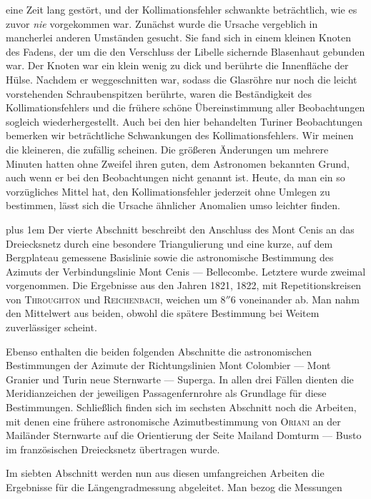 %
eine Zeit lang gestört, und der Kollimationsfehler schwankte beträchtlich, wie es zuvor \textit{nie} vorgekommen war. Zunächst wurde die Ursache vergeblich in mancherlei anderen Umständen gesucht. Sie fand sich in einem kleinen Knoten des Fadens, der um die den Verschluss der Libelle sichernde Blasenhaut gebunden war. Der Knoten war ein klein wenig zu dick und berührte die Innenfläche der Hülse. Nachdem er weggeschnitten war, sodass die Glasröhre nur noch die leicht vorstehenden Schraubenspitzen berührte, waren die Beständigkeit des Kollimationsfehlers und die frühere schöne Übereinstimmung aller Beobachtungen sogleich wiederhergestellt. Auch bei den hier behandelten Turiner Beobachtungen bemerken wir beträchtliche Schwankungen des Kollimationsfehlers. Wir meinen die kleineren, die zufällig scheinen. Die größeren Änderungen um mehrere Minuten hatten ohne Zweifel ihren guten, dem Astronomen bekannten Grund, auch wenn er bei den Beobachtungen nicht genannt ist. Heute, da man ein so vorzügliches Mittel hat, den Kollimationsfehler jederzeit ohne Umlegen zu bestimmen, lässt sich die Ursache ähnlicher Anomalien umso leichter finden.

\begingroup\rightskip=0pt plus 1em
Der vierte Abschnitt beschreibt den Anschluss des Mont Cenis an das Dreiecksnetz durch eine besondere Triangulierung und eine kurze, auf dem Bergplateau gemessene Basislinie sowie die astronomische Bestimmung des Azimuts der Verbindungslinie Mont Cenis --- Bellecombe. Letztere wurde zweimal vorgenommen. Die Ergebnisse aus den Jahren 1821, 1822, mit Repetitionskreisen von \textsc{Throughton} und \textsc{Reichenbach}, weichen um \(8''6\) voneinander ab. Man nahm den Mittelwert aus beiden, obwohl die spätere Bestimmung bei Weitem zuverlässiger scheint.\par
\endgroup

Ebenso enthalten die beiden folgenden Abschnitte die astronomischen Bestimmungen der Azimute der Richtungslinien Mont Colombier --- Mont Granier und Turin neue Sternwarte --- Superga. In allen drei Fällen dienten die Meridianzeichen der jeweiligen Passagenfernrohre als Grundlage für diese Bestimmungen. Schließlich finden sich im sechsten Abschnitt noch die Arbeiten, mit denen eine frühere astronomische Azimutbestimmung von \textsc{Oriani} an der Mailänder Sternwarte auf die Orientierung der Seite Mailand Domturm --- Busto im französischen Dreiecksnetz übertragen wurde.

Im siebten Abschnitt werden nun aus diesen umfangreichen Arbeiten die Ergebnisse für die Längengradmessung abgeleitet. Man bezog die Messungen
